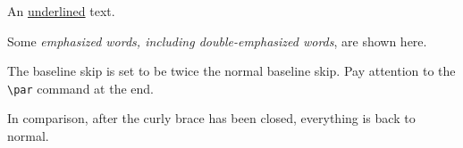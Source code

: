 \documentclass[12pt]{ctexrep}
\begin{document}

An \underline{underlined} text.



Some \emph{emphasized words,
including \emph{double-emphasized}
words}, are shown here.








{\linespread{2.0}\selectfont
The baseline skip is set to be 
twice the normal baseline skip.
Pay attention to the \verb|\par|
command at the end. \par }

In comparison, after the 
curly brace has been closed,
everything is back to normal.

\end{document}

